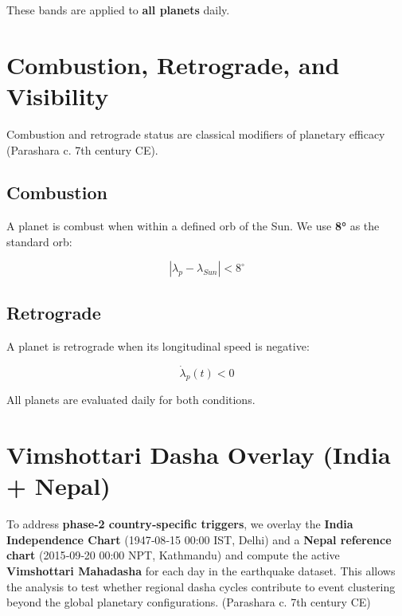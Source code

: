 \documentclass[
  11pt,
  a4paper,
  oneside,
  openany]{report}
\begin{document}
These bands are applied to \textbf{all planets} daily.

\chapter{Combustion, Retrograde, and
Visibility}\label{combustion-retrograde-and-visibility}

Combustion and retrograde status are classical modifiers of planetary
efficacy (Parashara c. 7th century CE).

\section{Combustion}\label{combustion}

A planet is combust when within a defined orb of the Sun. We use
\textbf{8°} as the standard orb:

\[
|\lambda_p - \lambda_{Sun}| < 8^\circ
\]

\section{Retrograde}\label{retrograde}

A planet is retrograde when its longitudinal speed is negative:

\[
\dot{\lambda}_p(t) < 0
\]

All planets are evaluated daily for both conditions.

\chapter{Vimshottari Dasha Overlay (India +
Nepal)}\label{vimshottari-dasha-overlay-india-nepal}

To address \textbf{phase‑2 country‑specific triggers}, we overlay the
\textbf{India Independence Chart} (1947‑08‑15 00:00 IST, Delhi) and a
\textbf{Nepal reference chart} (2015‑09‑20 00:00 NPT, Kathmandu) and
compute the active \textbf{Vimshottari Mahadasha} for each day in the
earthquake dataset. This allows the analysis to test whether regional
dasha cycles contribute to event clustering beyond the global planetary
configurations. (Parashara c. 7th century CE)
\end{document}
